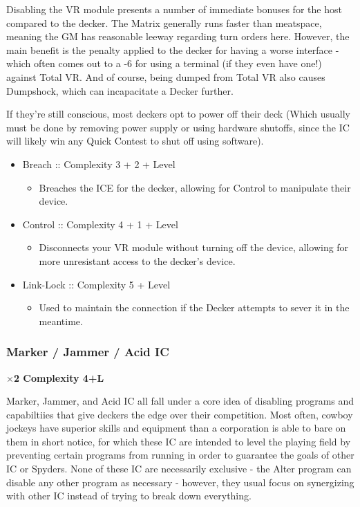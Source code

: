 \begin{multicols}{2}
	Disabling the VR module presents a number of immediate bonuses for the host compared to the decker. The Matrix generally runs faster than meatspace, meaning the GM has reasonable leeway regarding turn orders here. However, the main benefit is the penalty applied to the decker for having a worse interface - which often comes out to a -6 for using a terminal (if they even have one!) against Total VR. And of course, being dumped from Total VR also causes Dumpshock, which can incapacitate a Decker further. 
	
	If they're still conscious, most deckers opt to power off their deck (Which usually must be done by removing power supply or using hardware shutoffs, since the IC will likely win any Quick Contest to shut off using software).
	
	\begin{itemize}
		\itemsep 0pt
		\item Breach :: Complexity 3 + 2 + Level
		\begin{itemize}
			\itemsep 0pt
			\item Breaches the ICE for the decker, allowing for Control to manipulate their device.
		\end{itemize}
		\item Control :: Complexity 4 + 1 + Level
		\begin{itemize}
			\itemsep 0pt
			\item Disconnects your VR module without turning off the device, allowing for more unresistant access to the decker's device.
		\end{itemize}
		\item Link-Lock :: Complexity 5 + Level
		\begin{itemize}
			\itemsep 0pt
			\item Used to maintain the connection if the Decker attempts to sever it in the meantime.
		\end{itemize}
	\end{itemize}
	
	\subsubsection{Marker / Jammer / Acid IC}
	
	\textbf{$\times$2 Complexity 4+L}
	
	Marker, Jammer, and Acid IC all fall under a core idea of disabling programs and capabiltiies that give deckers the edge over their competition. Most often, cowboy jockeys have superior skills and equipment than a corporation is able to bare on them in short notice, for which these IC are intended to level the playing field by preventing certain programs from running in order to guarantee the goals of other IC or Spyders. None of these IC are necessarily exclusive - the Alter program can disable any other program as necessary - however, they usual focus on synergizing with other IC instead of trying to break down everything.
	

\end{multicols}
